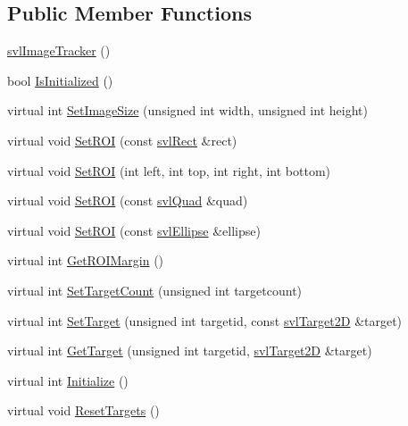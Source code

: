 \subsection*{Public Member Functions}
\begin{DoxyCompactItemize}
\item 
\hyperlink{classsvl_image_tracker_ab130e149fbc53c12361f616549f84c46}{svl\+Image\+Tracker} ()
\item 
bool \hyperlink{classsvl_image_tracker_a24e5e8a1a815d9e3623c66843d26df54}{Is\+Initialized} ()
\item 
virtual int \hyperlink{classsvl_image_tracker_afb9901eea52ba7bbdc2c70a0f4e5af09}{Set\+Image\+Size} (unsigned int width, unsigned int height)
\item 
virtual void \hyperlink{classsvl_image_tracker_aba04fa0ae482bc0c0cfcfcdc3608a4eb}{Set\+R\+O\+I} (const \hyperlink{structsvl_rect}{svl\+Rect} \&rect)
\item 
virtual void \hyperlink{classsvl_image_tracker_ab96f03b502eb23724acaf6c892981ac5}{Set\+R\+O\+I} (int left, int top, int right, int bottom)
\item 
virtual void \hyperlink{classsvl_image_tracker_ab65af89cd2f8498a27d02d4fe88265f6}{Set\+R\+O\+I} (const \hyperlink{structsvl_quad}{svl\+Quad} \&quad)
\item 
virtual void \hyperlink{classsvl_image_tracker_a43925e4cb1461046d3ac7f1f923e86ac}{Set\+R\+O\+I} (const \hyperlink{structsvl_ellipse}{svl\+Ellipse} \&ellipse)
\item 
virtual int \hyperlink{classsvl_image_tracker_a293f114b4d3cbf8bc32c2e5ce2fe8889}{Get\+R\+O\+I\+Margin} ()
\item 
virtual int \hyperlink{classsvl_image_tracker_a37dd0dd1b30ce96784258bb359a790d6}{Set\+Target\+Count} (unsigned int targetcount)
\item 
virtual int \hyperlink{classsvl_image_tracker_a33dbddc5e274df467a2f459652fa620f}{Set\+Target} (unsigned int targetid, const \hyperlink{structsvl_target2_d}{svl\+Target2\+D} \&target)
\item 
virtual int \hyperlink{classsvl_image_tracker_aaf99e4e4e69e44f6e57f97f8322a9e76}{Get\+Target} (unsigned int targetid, \hyperlink{structsvl_target2_d}{svl\+Target2\+D} \&target)
\item 
virtual int \hyperlink{classsvl_image_tracker_a530ac429c83a63e48e00eac848d4d2ec}{Initialize} ()
\item 
virtual void \hyperlink{classsvl_image_tracker_a29a3d1e5434ce42eb568aa861b33ce96}{Reset\+Targets} ()
\item 

\end{DoxyCompactItemize}
